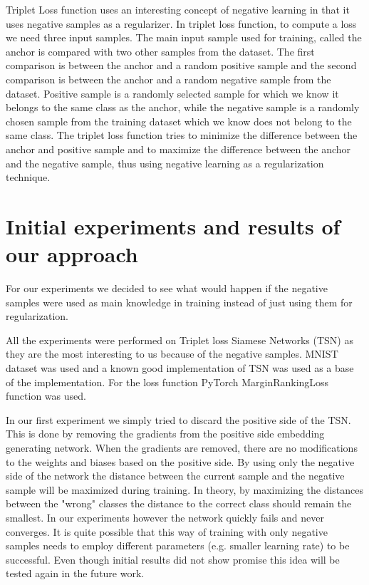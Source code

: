\documentclass[b5paper]{book}
\begin{document}
Triplet Loss function uses an interesting concept of negative learning in that it uses negative samples as a regularizer. In triplet loss function, to compute a loss we need three input samples. The main input sample used for training, called the anchor is compared with two other samples from the dataset. The first comparison is between the anchor and a random positive sample and the second comparison is between the anchor and a random negative sample from the dataset. Positive sample is a randomly selected sample for which we know it belongs to the same class as the anchor, while the negative sample is a randomly chosen sample from the training dataset which we know does not belong to the same class. The triplet loss function tries to minimize the difference between the anchor and positive sample and to maximize the difference between the anchor and the negative sample, thus using negative learning as a regularization technique.

\section{Initial experiments and results of our approach}

For our experiments we decided to see what would happen if the negative samples were used as main knowledge in training instead of just using them for regularization. 

All the experiments were performed on Triplet loss Siamese Networks (TSN) as they are the most interesting to us because of the negative samples. MNIST dataset was used and a known good implementation of TSN was used as a base of the implementation. For the loss function PyTorch MarginRankingLoss function was used.

In our first experiment we simply tried to discard the positive side of the TSN. This is done by removing the gradients from the positive side embedding generating network. When the gradients are removed, there are no modifications to the weights and biases based on the positive side. By using only the negative side of the network the distance between the current sample and the negative sample will be maximized during training. In theory, by maximizing the distances between the "wrong" classes the distance to the correct class should remain the smallest. In our experiments however the network quickly fails and never converges. It is quite possible that this way of training with only negative samples needs to employ different parameters (e.g. smaller learning rate) to be successful. Even though initial results did not show promise this idea will be tested again in the future work. 
\end{document}
